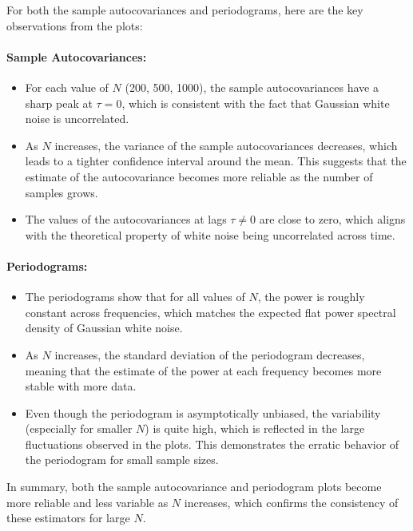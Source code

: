 \documentclass[11pt]{article}
\begin{document}

\begin{solution}

    For both the sample autocovariances and periodograms, here are the key observations from the plots:
    
    \paragraph{Sample Autocovariances:}
    \begin{itemize}    
        \item For each value of $N$ (200, 500, 1000), the sample autocovariances have a sharp peak at $\tau = 0$, which is consistent with the fact that Gaussian white noise is uncorrelated. 
        \item As $N$ increases, the variance of the sample autocovariances decreases, which leads to a tighter confidence interval around the mean. This suggests that the estimate of the autocovariance becomes more reliable as the number of samples grows.
        \item The values of the autocovariances at lags $\tau \neq 0$ are close to zero, which aligns with the theoretical property of white noise being uncorrelated across time.
    \end{itemize}

    \paragraph{Periodograms:}
    \begin{itemize} 
        \item The periodograms show that for all values of $N$, the power is roughly constant across frequencies, which matches the expected flat power spectral density of Gaussian white noise.
        \item As $N$ increases, the standard deviation of the periodogram decreases, meaning that the estimate of the power at each frequency becomes more stable with more data.
        \item Even though the periodogram is asymptotically unbiased, the variability (especially for smaller $N$) is quite high, which is reflected in the large fluctuations observed in the plots. This demonstrates the erratic behavior of the periodogram for small sample sizes.
    \end{itemize}

    In summary, both the sample autocovariance and periodogram plots become more reliable and less variable as $N$ increases, which confirms the consistency of these estimators for large $N$.
    
    \end{solution}
    
\end{document}
